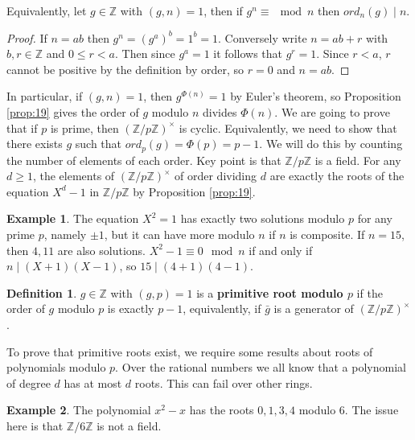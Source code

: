 \documentclass{article}
\newcommand{\Z}{\mathbb{Z}}
\newcommand{\rb}[1]{\left( #1 \right)}
\newcommand{\unit}[1]{\rb{\Z / #1\Z}^\times}
\theoremstyle{definition}\newtheorem{definition}{Definition}
\theoremstyle{definition}\newtheorem{remark}[definition]{Remark}
\theoremstyle{definition}\newtheorem*{example}{Example}
\theoremstyle{definition}\newtheorem*{note}{Note}
\begin{document}
Equivalently, let $ g \in \Z $ with $ \rb{g, n} = 1 $, then if $ g^n \equiv \mod n $ then $ ord_n\rb{g} \mid n $.

\begin{proof}
If $ n = ab $ then $ g^n = \rb{g^a}^b = 1^b = 1 $. Conversely write $ n = ab + r $ with $ b, r \in \Z $ and $ 0 \le r < a $. Then since $ g^a = 1 $ it follows that $ g^r = 1 $. Since $ r < a $, $ r $ cannot be positive by the definition by order, so $ r = 0 $ and $ n = ab $.
\end{proof}

In particular, if $ \rb{g, n} = 1 $, then $ g^{\Phi\rb{n}} = 1 $ by Euler's theorem, so Proposition \ref{prop:19} gives the order of $ g $ modulo $ n $ divides $ \Phi\rb{n} $. We are going to prove that if $ p $ is prime, then $ \unit{p} $ is cyclic. Equivalently, we need to show that there exists $ g $ such that $ ord_p\rb{g} = \Phi\rb{p} = p - 1 $. We will do this by counting the number of elements of each order. Key point is that $ \Z / p\Z $ is a field. For any $ d \ge 1 $, the elements of $ \unit{p} $ of order dividing $ d $ are exactly the roots of the equation $ X^d - 1 $ in $ \Z / p\Z $ by Proposition \ref{prop:19}.

\begin{example}
The equation $ X^2 = 1 $ has exactly two solutions modulo $ p $ for any prime $ p $, namely $ \pm 1 $, but it can have more modulo $ n $ if $ n $ is composite. If $ n = 15 $, then $ 4, 11 $ are also solutions. $ X^2 - 1 \equiv 0 \mod n $ if and only if $ n \mid \rb{X + 1}\rb{X - 1} $, so $ 15 \mid \rb{4 + 1}\rb{4 - 1} $.
\end{example}

\begin{definition}
$ g \in \Z $ with $ \rb{g, p} = 1 $ is a \textbf{primitive root modulo $ p $} if the order of $ g $ modulo $ p $ is exactly $ p - 1 $, equivalently, if $ \bar{g} $ is a generator of $ \unit{p} $.
\end{definition}

To prove that primitive roots exist, we require some results about roots of polynomials modulo $ p $. Over the rational numbers we all know that a polynomial of degree $ d $ has at most $ d $ roots. This can fail over other rings.

\begin{example}
The polynomial $ x^2 - x $ has the roots $ 0, 1, 3, 4 $ modulo $ 6 $. The issue here is that $ \Z / 6\Z $ is not a field.
\end{example}
\end{document}
